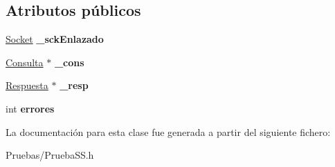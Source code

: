 \subsection*{\-Atributos públicos}
\begin{DoxyCompactItemize}
\item 
\hypertarget{classssReceptor_a70ae2164482a6e39c560d08160440376}{\hyperlink{classSocket}{\-Socket} {\bfseries \-\_\-sck\-Enlazado}}\label{classssReceptor_a70ae2164482a6e39c560d08160440376}

\item 
\hypertarget{classssReceptor_a7d0c8b66c17580cd9ac9b0ac5419befb}{\hyperlink{classConsulta}{\-Consulta} $\ast$ {\bfseries \-\_\-cons}}\label{classssReceptor_a7d0c8b66c17580cd9ac9b0ac5419befb}

\item 
\hypertarget{classssReceptor_a9234461cea153a9cc6868e4be45bd7e7}{\hyperlink{classRespuesta}{\-Respuesta} $\ast$ {\bfseries \-\_\-resp}}\label{classssReceptor_a9234461cea153a9cc6868e4be45bd7e7}

\item 
\hypertarget{classssReceptor_a7d969407315baede903eab027b9867c7}{int {\bfseries errores}}\label{classssReceptor_a7d969407315baede903eab027b9867c7}

\end{DoxyCompactItemize}


\-La documentación para esta clase fue generada a partir del siguiente fichero\-:\begin{DoxyCompactItemize}
\item 
\-Pruebas/\-Prueba\-S\-S.\-h\end{DoxyCompactItemize}
